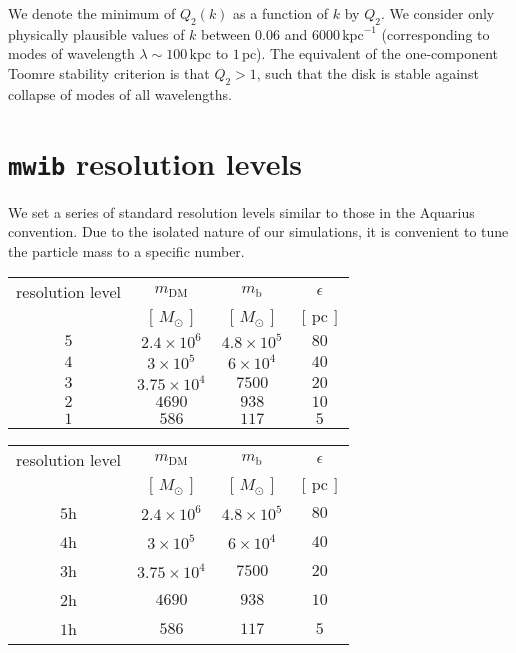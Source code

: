 \documentclass[a4paper,fleqn,usenatbib]{mnras}
\newcommand{\pc}{\ensuremath{\text{pc}}}
\newcommand{\kpc}{\ensuremath{\text{kpc}}}
\newcommand{\mwib}{\texttt{mwib}}
\begin{document}
We denote the minimum of $Q_2(k)$ as a function of $k$ by $Q_2$. We consider
only physically plausible values of $k$ between $0.06$ and $6000\,\kpc^{-1}$
(corresponding to modes of wavelength $\lambda\sim100\,\kpc$ to $1\,\pc$). The
equivalent of the one-component Toomre stability criterion is that $Q_2>1$,
such that the disk is stable against collapse of modes of all wavelengths.

\section{\mwib{} resolution levels}
We set a series of standard resolution levels similar to those in the Aquarius
convention. Due to the isolated nature of our simulations, it is convenient to
tune the particle mass to a specific number.

\begin{table}
\begin{tabular}{cccc}
resolution level & $m_{\text{DM}}$      & $m_{\text{b}}$    & $\epsilon$        \\
                 & $[\,M_{\odot}\,]$    & $[\,M_{\odot}\,]$ & $[\,\text{pc}\,]$ \\
$5$              & $2.4\times10^6$      & $4.8\times10^5$   & $80$             \\
$4$              & $3\times10^5$        & $6\times10^4$     & $40$             \\
$3$              & $3.75 \times 10^{4}$ & $7500$            & $20$             \\
$2$              & $4690$               & $938$             & $10$            \\
$1$              & $586$                & $117$             & $5$           
\end{tabular}
\end{table}

\begin{table}
\begin{tabular}{cccc}
resolution level & $m_{\text{DM}}$      & $m_{\text{b}}$    & $\epsilon$        \\
                 & $[\,M_{\odot}\,]$    & $[\,M_{\odot}\,]$ & $[\,\text{pc}\,]$ \\
$5$h             & $2.4\times10^6$      & $4.8\times10^5$   & $80$             \\
$4$h             & $3\times10^5$        & $6\times10^4$     & $40$             \\
$3$h             & $3.75 \times 10^{4}$ & $7500$            & $20$             \\
$2$h             & $4690$               & $938$             & $10$            \\
$1$h             & $586$                & $117$             & $5$           
\end{tabular}
\end{table}




\bsp	%
\label{lastpage}
\end{document}
